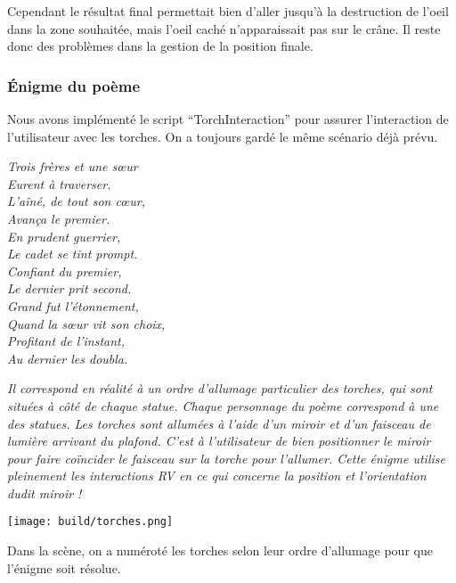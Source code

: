 \documentclass[12pt]{article}
\begin{document}
Cependant le résultat final permettait bien d’aller jusqu’à la destruction de l’oeil dans la zone souhaitée, mais l’oeil caché n’apparaissait pas sur le crâne. Il reste donc des problèmes dans la gestion de la position finale.

\subsubsection{Énigme du poème}
Nous avons implémenté le script “TorchInteraction” pour assurer l’interaction de l’utilisateur avec les torches. On a toujours gardé le même scénario déjà prévu.

\begin{center}
    \textit{Trois frères et une sœur \\
    Eurent à traverser. \\
    L'aîné, de tout son cœur, \\
    Avança le premier. \\
    En prudent guerrier, \\
    Le cadet se tint prompt. \\
    Confiant du premier, \\
    Le dernier prit second. \\
    Grand fut l’étonnement, \\
    Quand la sœur vit son choix, \\
    Profitant de l’instant, \\
    Au dernier les doubla.}
\end{center}

\textit{Il correspond en réalité à un ordre d’allumage particulier des torches, qui sont situées à côté de chaque statue. Chaque personnage du poème correspond à une des statues. Les torches sont allumées à l’aide d’un miroir et d’un faisceau de lumière arrivant du plafond. C’est à l’utilisateur de bien positionner le miroir pour faire coïncider le faisceau sur la torche pour l’allumer. Cette énigme utilise pleinement les interactions RV en ce qui concerne la position et l’orientation dudit miroir !}

\begin{center}
    \texttt{[image: build/torches.png]}
\end{center}

Dans la scène, on a numéroté les torches selon leur ordre d’allumage pour que l’énigme soit résolue.
\end{document}
